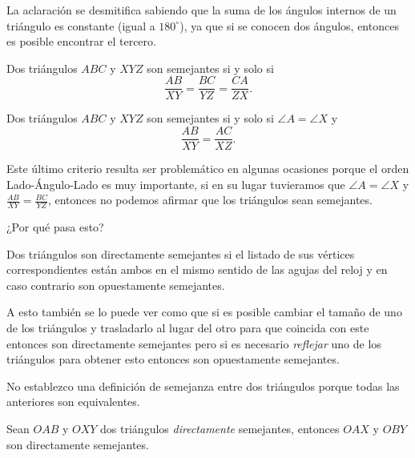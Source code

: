 \begin{remark}
	La aclaración se desmitifica sabiendo que
	la suma de los ángulos internos de un triángulo es
	constante (igual a $180^\circ$), ya que si
	se conocen dos ángulos, entonces es posible encontrar el tercero.
\end{remark}

\begin{theorem}
	Dos triángulos $ABC$ y $XYZ$ son semejantes si y solo si
	\[\frac{AB}{XY} = \frac{BC}{YZ} = \frac{CA}{ZX}.\]
\end{theorem}

\begin{theorem}
	Dos triángulos $ABC$ y $XYZ$ son semejantes si y solo si
	$\angle A = \angle X$ y
	\[\frac{AB}{XY} = \frac{AC}{XZ}.\]
\end{theorem}

Este último criterio resulta ser problemático
en algunas ocasiones porque el orden Lado-Ángulo-Lado
es muy importante, si en su lugar tuvieramos que
$\angle A = \angle X$ y $\frac{AB}{XY} = \frac{BC}{YZ}$,
entonces no podemos afirmar que los triángulos
sean semejantes.

\begin{question*}
	¿Por qué pasa esto?
\end{question*}

\begin{definition}
	Dos triángulos son directamente semejantes si
	el listado de sus vértices correspondientes
	están ambos en el mismo sentido de
	las agujas del reloj y en caso contrario
	son opuestamente semejantes.
\end{definition}

A esto también se lo puede ver como que
si es posible cambiar el tamaño de uno de
los triángulos y trasladarlo al lugar del otro
para que coincida con este entonces son directamente
semejantes pero si es necesario \textit{reflejar}
uno de los triángulos para obtener esto
entonces son opuestamente semejantes.

No establezco una definición de semejanza
entre dos triángulos porque todas las
anteriores son equivalentes.

\begin{lemma}\label{lemma:rotomotecia}
	Sean $OAB$ y $OXY$ dos triángulos \textit{directamente}
	semejantes, entonces $OAX$ y $OBY$
	son directamente semejantes.
\end{lemma}

